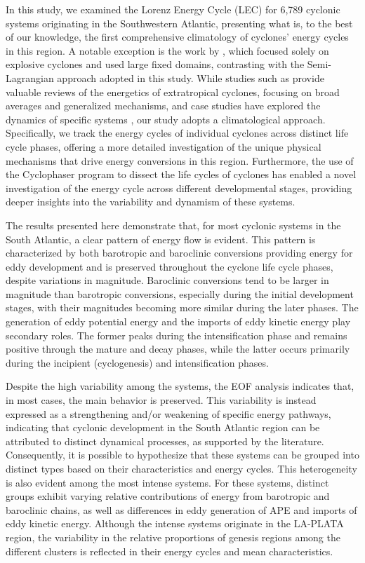 \documentclass[pdflatex,sn-chicago]{sn-jnl}%
\theoremstyle{plain}
\theoremstyle{definition}
\theoremstyle{remark}
\theoremstyle{definition}
\begin{document}
In this study, we examined the Lorenz Energy Cycle (LEC) for 6,789 cyclonic systems originating in the Southwestern Atlantic, presenting what is, to the best of our knowledge, the first comprehensive climatology of cyclones' energy cycles in this region. A notable exception is the work by \citet{black2013universal}, which focused solely on explosive cyclones and used large fixed domains, contrasting with the Semi-Lagrangian approach adopted in this study. While studies such as \citet{smith1980energetics} provide valuable reviews of the energetics of extratropical cyclones, focusing on broad averages and generalized mechanisms, and case studies have explored the dynamics of specific systems \citep[e.g.]{pezza2014large,dias2011energy,cavicchia2018energetics}, our study adopts a climatological approach. Specifically, we track the energy cycles of individual cyclones across distinct life cycle phases, offering a more detailed investigation of the unique physical mechanisms that drive energy conversions in this region. Furthermore, the use of the Cyclophaser program to dissect the life cycles of cyclones has enabled a novel investigation of the energy cycle across different developmental stages, providing deeper insights into the variability and dynamism of these systems.

The results presented here demonstrate that, for most cyclonic systems in the South Atlantic, a clear pattern of energy flow is evident. This pattern is characterized by both barotropic and baroclinic conversions providing energy for eddy development and is preserved throughout the cyclone life cycle phases, despite variations in magnitude. Baroclinic conversions tend to be larger in magnitude than barotropic conversions, especially during the initial development stages, with their magnitudes becoming more similar during the later phases. The generation of eddy potential energy and the imports of eddy kinetic energy play secondary roles. The former peaks during the intensification phase and remains positive through the mature and decay phases, while the latter occurs primarily during the incipient (cyclogenesis) and intensification phases.

Despite the high variability among the systems, the EOF analysis indicates that, in most cases, the main behavior is preserved. This variability is instead expressed as a strengthening and/or weakening of specific energy pathways, indicating that cyclonic development in the South Atlantic region can be attributed to distinct dynamical processes, as supported by the literature. Consequently, it is possible to hypothesize that these systems can be grouped into distinct types based on their characteristics and energy cycles. This heterogeneity is also evident among the most intense systems. For these systems, distinct groups exhibit varying relative contributions of energy from barotropic and baroclinic chains, as well as differences in eddy generation of APE and imports of eddy kinetic energy. Although the intense systems originate in the LA-PLATA region, the variability in the relative proportions of genesis regions among the different clusters is reflected in their energy cycles and mean characteristics.
\end{document}
